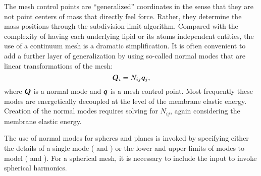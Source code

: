 
The mesh control points are ``generalized'' coordinates in the sense that they are not point centers of mass that directly feel force.
Rather, they determine the mass positions through the subdivision-limit algorithm.
Compared with the complexity of having each underlying lipid or its atoms independent entities, the use of a continuum mesh is a dramatic simplification.
It is often convenient to add a further layer of generalization by using so-called normal modes that are linear transformations of the mesh:
\begin{equation}
\boldsymbol{Q}_i = N_{ij} \boldsymbol{q}_j,  
\end{equation}
where $\boldsymbol{Q}$ is a normal mode and $\boldsymbol{q}$ is a mesh control point. 
Most frequently these modes are energetically decoupled at the level of the membrane elastic energy.
Creation of the normal modes requires solving for $N_{ij}$, again considering the membrane elastic energy.

The use of normal modes for spheres and planes is invoked by specifying either 
the details of a single mode ( and ) or the lower and upper limits of modes to model ( and ).  
For a spherical mesh, it is necessary to include the input  to invoke spherical harmonics. 
